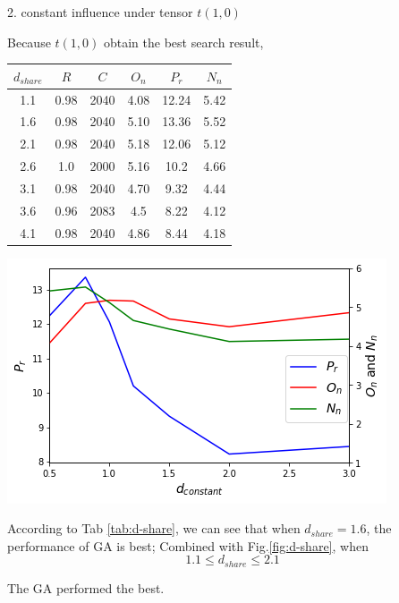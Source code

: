 \documentclass[smallextended]{svjour3}       %
\begin{document}
\begin{multicols}{2}
2. constant influence under tensor $t(1,0)$

Because $t(1,0)$ obtain the best search result,

\begin{center}
\begin{tabular}{cccccc}
	\toprule
    $d_{share}$ & $R$ & $C$ & $O_{n}$ & $P_{r}$ & $N_{n}$\\
	\midrule
    1.1 & 0.98 & 2040 & 4.08 & 12.24 & 5.42 \\
    1.6 & 0.98 & 2040 & 5.10 & 13.36 & 5.52 \\
    2.1 & 0.98 & 2040 & 5.18 & 12.06 & 5.12 \\
    2.6 & 1.0  & 2000 & 5.16 & 10.2 & 4.66 \\
    3.1 & 0.98 & 2040 & 4.70 & 9.32 & 4.44 \\
    3.6 & 0.96 & 2083 & 4.5  & 8.22 & 4.12 \\
    4.1 & 0.98 & 2040 & 4.86 & 8.44 & 4.18 \\
	\bottomrule
\end{tabular}
\label{tab:d-share}
\end{center}

\begin{center}
  \includegraphics[width=\linewidth]{GA_images/d_constant.png}
  \label{fig:d-share}
\end{center}

According to Tab \ref{tab:d-share},  we can see that when $d_{share}=1.6$,
the performance of GA is best; Combined with Fig.\ref{fig:d-share}, when 
$$1.1 \leq d_{share} \leq 2.1$$

The GA performed the best.



\end{multicols}
\end{document}
